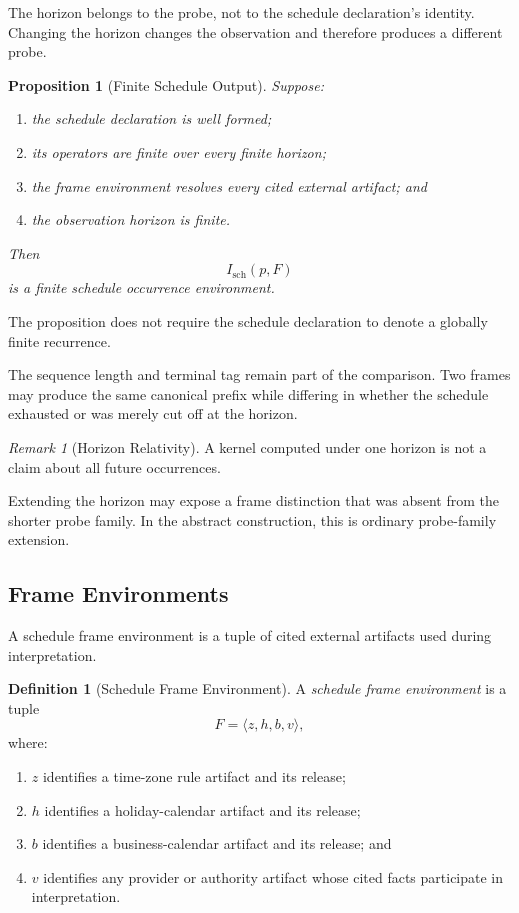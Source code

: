 \documentclass[11pt]{article}
\theoremstyle{plain}
\newtheorem{proposition}[theorem]{Proposition}
\theoremstyle{definition}
\newtheorem{definition}[theorem]{Definition}
\theoremstyle{remark}
\newtheorem{remark}[theorem]{Remark}
\begin{document}
The horizon belongs to the probe,
not to the schedule declaration's identity.
Changing the horizon changes the observation
and therefore produces a different probe.

\begin{proposition}[Finite Schedule Output]
  \label{ik.prop.finite-schedule-output}
  Suppose:
  \begin{enumerate}[label=(\alph*)]
    \item the schedule declaration is well formed;
    \item its operators are finite over every finite horizon;
    \item the frame environment resolves every cited external artifact; and
    \item the observation horizon is finite.
  \end{enumerate}

  Then
  \[
    I_{\mathrm{sch}}(p,F)
  \]
  is a finite schedule occurrence environment.
\end{proposition}

The proposition does not require
the schedule declaration to denote
a globally finite recurrence.

The sequence length and terminal tag
remain part of the comparison.
Two frames may produce the same canonical prefix
while differing in whether the schedule exhausted
or was merely cut off at the horizon.

\begin{remark}[Horizon Relativity]
  \label{ik.rem.schedule-horizon-relative}
  A kernel computed under one horizon
  is not a claim about all future occurrences.

  Extending the horizon may expose
  a frame distinction that was absent
  from the shorter probe family.
  In the abstract construction,
  this is ordinary probe-family extension.
\end{remark}

\subsection{Frame Environments}

A schedule frame environment
is a tuple of cited external artifacts
used during interpretation.

\begin{definition}[Schedule Frame Environment]
  \label{ik.def.schedule-frame}
  A \emph{schedule frame environment} is a tuple
  \[
    F
    =
    \langle
    z,
    h,
    b,
    v
    \rangle,
  \]
  where:
  \begin{enumerate}[label=(\alph*)]
    \item \(z\) identifies a time-zone rule artifact
          and its release;
    \item \(h\) identifies a holiday-calendar artifact
          and its release;
    \item \(b\) identifies a business-calendar artifact
          and its release; and
    \item \(v\) identifies any provider or authority artifact
          whose cited facts participate in interpretation.
  \end{enumerate}
\end{definition}
\end{document}

